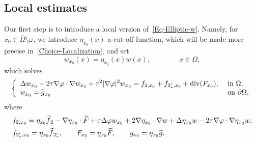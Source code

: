 \documentclass[AHL,Unicode,longabstracts]{cedram}
\newcommand*\ds{\displaystyle}
\renewcommand{\tilde}{\widetilde}
\renewcommand{\div}{\operatorname{div}}
\let\oldtilde\tilde
\renewcommand*{\tilde}[1]{\mathchoice{\widetilde{#1}}{\widetilde{#1}}{\oldtilde{#1}}{\oldtilde{#1}}}
\begin{document}
\subsection{Local estimates}

Our first step is to introduce a local version of~\eqref{Eq-Elliptic-w}. Namely, for $x_0 \in \overline\Omega\setminus \omega$, we introduce $\eta_{x_0}(x)$ a cut-off function, which will be made more precise in~\eqref{Choice-Localization}, and set
\begin{equation*}
w_{x_0}(x) = \eta_{x_0}(x) w(x), \qquad \qquad x \in \Omega,
\end{equation*}
which solves
\begin{equation}\label{Eq-Elliptic-w-x0}
\left\{
\begin{array}{ll}
\ds \Delta w_{x_0} - 2\tau \nabla \varphi \cdot \nabla w_{x_0} + \tau^2 |\nabla \varphi|^2 w_{x_0} = f_{2,x_0} + f_{2_*',x_0} + \div(F_{x_0}), & \text{ in } \Omega,
\\
\ds w_{x_0} = \tilde g_{x_0} & \text{ on } \partial \Omega,
\end{array}
\right.
\end{equation}
where
\begin{align*}
& f_{2,x_0} = \eta_{x_0} \tilde f_2 -\nabla \eta_{x_0} \cdot \tilde F + \tau \Delta \varphi w_{x_0} +2 \nabla \eta_{x_0} \cdot \nabla w + \Delta \eta_{x_0} w - 2 \tau \nabla \varphi \cdot \nabla \eta_{x_0} w,
\\
& f_{2_*',x_0} = \eta_{x_0} \tilde f_{2_*'},
\qquad F_{x_0} = \eta_{x_0} \tilde F,
\qquad g_{x_0} = \eta_{x_0} \tilde g.
\end{align*}
\end{document}
